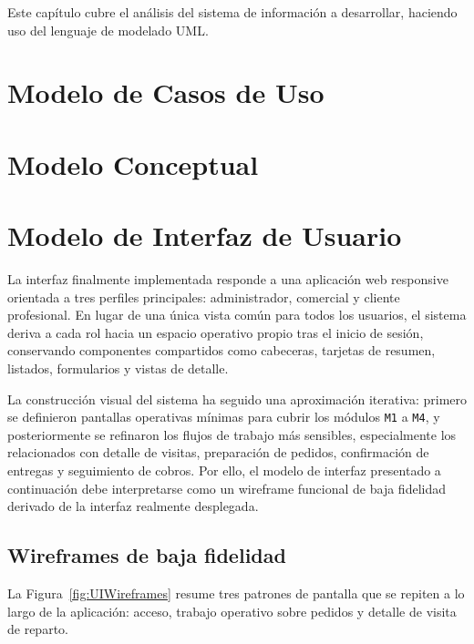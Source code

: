 Este capítulo cubre el análisis del sistema de información a desarrollar, haciendo uso del lenguaje de modelado UML.

\section{Modelo de Casos de Uso}
\label{sec:usecases}


\section{Modelo Conceptual}
\label{sec:conceptualmodel}


\section{Modelo de Interfaz de Usuario}
\label{sec:uiModel}
La interfaz finalmente implementada responde a una aplicación web responsive orientada a tres perfiles principales: administrador, comercial y cliente profesional. En lugar de una única vista común para todos los usuarios, el sistema deriva a cada rol hacia un espacio operativo propio tras el inicio de sesión, conservando componentes compartidos como cabeceras, tarjetas de resumen, listados, formularios y vistas de detalle.

La construcción visual del sistema ha seguido una aproximación iterativa: primero se definieron pantallas operativas mínimas para cubrir los módulos \texttt{M1} a \texttt{M4}, y posteriormente se refinaron los flujos de trabajo más sensibles, especialmente los relacionados con detalle de visitas, preparación de pedidos, confirmación de entregas y seguimiento de cobros. Por ello, el modelo de interfaz presentado a continuación debe interpretarse como un wireframe funcional de baja fidelidad derivado de la interfaz realmente desplegada.

\subsection{Wireframes de baja fidelidad}

La Figura~\ref{fig:UIWireframes} resume tres patrones de pantalla que se repiten a lo largo de la aplicación: acceso, trabajo operativo sobre pedidos y detalle de visita de reparto.

